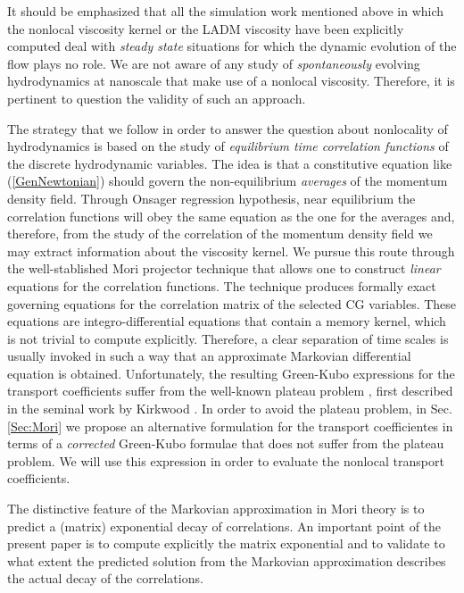 \documentclass[b5paper,openright,11pt]{book}
\begin{document}
It should be  emphasized that all the simulation  work mentioned above
in which  the nonlocal  viscosity kernel or  the LADM  viscosity have
been explicitly  computed deal  with \textit{steady  state} situations
for which the dynamic evolution of the  flow plays no role. We are not
aware of any study of \textit{spontaneously} evolving hydrodynamics at
nanoscale that  make use  of a nonlocal  viscosity. Therefore,  it is
pertinent to question the validity of such an approach.

The strategy  that we follow in  order to answer
the question about nonlocality of hydrodynamics is based on the study
of  \textit{equilibrium time  correlation functions}  of the  discrete
hydrodynamic variables.  The idea is that a constitutive equation like
(\ref{GenNewtonian})     should     govern     the     non-equilibrium
\textit{averages}  of the  momentum  density  field.  Through  Onsager
regression hypothesis, near equilibrium the correlation functions will
obey the  same equation as  the one  for the averages  and, therefore,
from the study of the correlation of the momentum density field we may
extract information about the viscosity  kernel.  We pursue this route
through the  well-stablished Mori projector technique  that allows one
to construct \textit{linear} equations  for the correlation functions.
The  technique produces  formally  exact governing  equations for  the
correlation matrix of the selected  CG variables.  These equations are
integro-differential equations that contain  a memory kernel, which is
not trivial to  compute explicitly.  Therefore, a  clear separation of
time  scales is  usually invoked  in such  a way  that an  approximate
Markovian  differential  equation  is  obtained.   Unfortunately,  the
resulting Green-Kubo expressions for the transport coefficients suffer
from   the  well-known   plateau  problem   \cite{Espanol1998},  first
described in the seminal work by Kirkwood \cite{Kirkwood1949}. In order to avoid the plateau problem, in Sec. \ref{Sec:Mori} we propose an alternative formulation for the transport coefficientes in terms of a  \textit{corrected} Green-Kubo formulae that
does  not suffer  from the  plateau problem. We will use this expression  in order to evaluate the nonlocal
transport coefficients.

The distinctive feature of the  Markovian approximation in Mori theory
is  to  predict  a  (matrix) exponential  decay  of  correlations.  An
important  point of  the present  paper is  to compute  explicitly the
matrix  exponential  and to  validate  to  what extent  the  predicted
solution from  the Markovian approximation describes  the actual decay
of the correlations.
\end{document}
